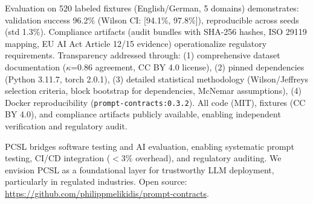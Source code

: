\documentclass[sigconf]{acmart}
\begin{document}
Evaluation on 520 labeled fixtures (English/German, 5 domains) demonstrates: validation success 96.2\% (Wilson CI: [94.1\%, 97.8\%]), reproducible across seeds (std 1.3\%). Compliance artifacts (audit bundles with SHA-256 hashes, ISO 29119 mapping, EU AI Act Article 12/15 evidence) operationalize regulatory requirements. Transparency addressed through: (1) comprehensive dataset documentation (\(\kappa\)=0.86 agreement, CC BY 4.0 license), (2) pinned dependencies (Python 3.11.7, torch 2.0.1), (3) detailed statistical methodology (Wilson/Jeffreys selection criteria, block bootstrap for dependencies, McNemar assumptions), (4) Docker reproducibility (\texttt{prompt-contracts:0.3.2}). All code (MIT), fixtures (CC BY 4.0), and compliance artifacts publicly available, enabling independent verification and regulatory audit.

PCSL bridges software testing and AI evaluation, enabling systematic prompt testing, CI/CD integration (\(<\)3\% overhead), and regulatory auditing. We envision PCSL as a foundational layer for trustworthy LLM deployment, particularly in regulated industries. Open source: \url{https://github.com/philippmelikidis/prompt-contracts}.



\end{document}
